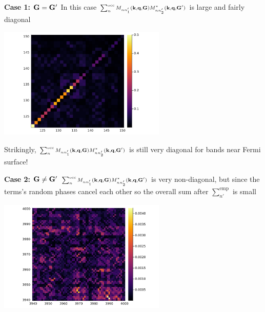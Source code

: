 \documentclass[t]{beamer}
\begin{document}
\begin{frame}[allowframebreaks]
\framebreak

\textbf{Case 1: $\vb{G} = \vb{G}'$}  In this case $\scriptstyle \sum_{n}^{\text{occ}} M_{n n'_1} (\vb{k}, \vb{q}, \vb{G}) M^*_{nn'_2} (\vb{k}, \vb{q}, \vb{G}')$ is large and fairly diagonal

\begin{center}
    \includegraphics[width=0.6\textwidth]{../data/chi/nc_range-121-150-k_idx-2-q_idx-3-G_idx-100.png}
\end{center}

Strikingly, $\scriptstyle \sum_{n}^{\text{occ}} M_{n n'_1} (\vb{k}, \vb{q}, \vb{G}) M^*_{nn'_2} (\vb{k}, \vb{q}, \vb{G}')$ is still very diagonal for bands near Fermi surface!

\framebreak

\textbf{Case 2: $\vb{G} \neq \vb{G}'$} $\scriptstyle \sum_{n}^{\text{occ}} M_{n n'_1} (\vb{k}, \vb{q}, \vb{G}) M^*_{nn'_2} (\vb{k}, \vb{q}, \vb{G}')$ is very non-diagonal, 
but since the terms's random phases cancel each other so the overall sum after $\sum_{n'}^{\text{emp}}$ is small

\begin{center}
    \includegraphics[width=0.6\textwidth]{../data/chi/nc_range-3939-4000-k_idx-2-q_idx-3-G1_idx-2000-G2_idx-2001.png}
\end{center}

\end{frame}
\end{document}
